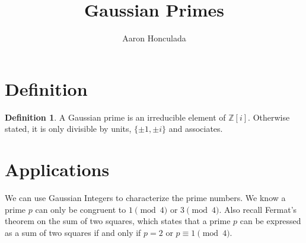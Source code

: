 \documentclass{article}
\title{Gaussian Primes}
\author{Aaron Honculada}
\date{\monthname[\month] \the\year}
\theoremstyle{plain} %
\theoremstyle{definition} %
\newtheorem{definition}[theorem]{Definition}
\begin{document}
\maketitle
\section{Definition}

\begin{definition}
    A Gaussian prime is an irreducible element of $\mathbb{Z}[i]$.
    Otherwise stated, it is only divisible by units, $\{\pm 1, \pm i\}$ and associates.
\end{definition}

\section{Applications}
We can use Gaussian Integers to characterize the prime numbers. We know a prime $p$ can
only be congruent to $1 \pmod{4}$ or $3 \pmod{4}$. Also recall Fermat's theorem 
on the sum of two squares, which states that a prime $p$ can be expressed as a sum of two squares
if and only if $p = 2$ or $p \equiv 1 \pmod{4}$.
\end{document}
